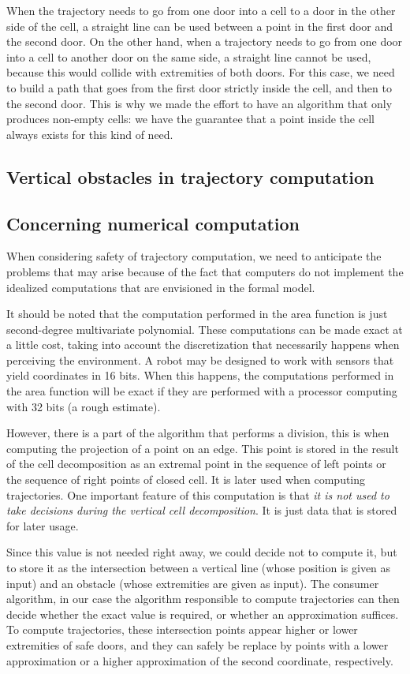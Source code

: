 \documentclass[a4paper, USenglish, cleveref, autoref, thm-restate]{lipics-v2021}
\begin{document}
When the trajectory needs to go from one door into a cell to a door in
the other side of the cell, a straight line can be used between a
point in the first door and the second door.  On the other hand, when
a trajectory needs to go from one door into a cell to another door on
the same side, a straight line cannot be used, because this would
collide with extremities of both doors.  For this case, we need to
build a path that goes from the first door strictly inside the cell,
and then to the second door.  This is why we made the effort to have
an algorithm that only produces non-empty cells: we have the guarantee
that a point inside the cell always exists for this kind of need.
\subsection{Vertical obstacles in trajectory computation}
\subsection{Concerning numerical computation}
When considering safety of trajectory computation, we need to
anticipate the problems that may arise because of the fact that
computers do not implement the idealized computations that are
envisioned in the formal model.

It should be noted that the computation performed in the area function
is just second-degree multivariate polynomial.  These computations can
be made exact at a little cost, taking into account the discretization
that necessarily happens when perceiving the environment.  A robot may
be designed to work with sensors that yield coordinates in 16 bits.
When this happens, the computations performed in the area function
will be exact if they are performed with a processor computing with 32
bits (a rough estimate).

However, there is a part of the algorithm that performs a division,
this is when computing the projection of a point on an edge.  This
point is stored in the result of the cell decomposition as an extremal
point in the sequence of left points or the sequence of right points
of closed cell.  It is later used when computing trajectories.  One
important feature of this computation is that {\em it is not used to
  take decisions during the vertical cell decomposition}.  It is just
data that is stored for later usage.

Since this value is not needed right away, we could decide not to
compute it, but to store it as the intersection between a vertical
line (whose position is given as input) and an obstacle (whose
extremities are given as input).  The consumer algorithm, in our case
the algorithm responsible to compute trajectories can then decide
whether the exact value is required, or whether an approximation
suffices.  To compute trajectories, these intersection points appear
higher or lower extremities of safe doors, and they can safely be
replace by points with a lower approximation or a higher approximation
of the second coordinate, respectively.
\end{document}
